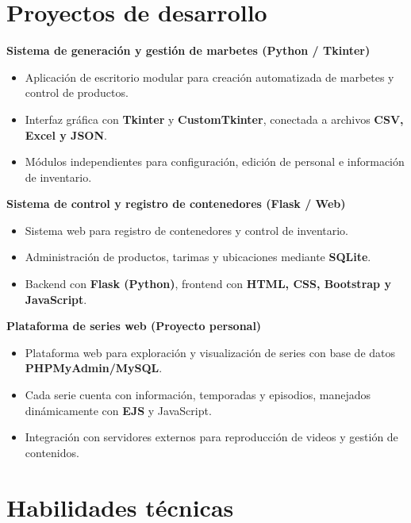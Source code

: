 \documentclass[11pt]{article}
\begin{document}
\vspace{6pt}

\section*{Proyectos de desarrollo}

\textbf{Sistema de generación y gestión de marbetes (Python / Tkinter)} 
\begin{itemize}[leftmargin=*, noitemsep]
    \item Aplicación de escritorio modular para creación automatizada de marbetes y control de productos.
    \item Interfaz gráfica con \textbf{Tkinter} y \textbf{CustomTkinter}, conectada a archivos \textbf{CSV, Excel y JSON}.
    \item Módulos independientes para configuración, edición de personal e información de inventario.
\end{itemize}

\textbf{Sistema de control y registro de contenedores (Flask / Web)} 
\begin{itemize}[leftmargin=*, noitemsep]
    \item Sistema web para registro de contenedores y control de inventario.
    \item Administración de productos, tarimas y ubicaciones mediante \textbf{SQLite}.
    \item Backend con \textbf{Flask (Python)}, frontend con \textbf{HTML, CSS, Bootstrap y JavaScript}.
\end{itemize}

\textbf{Plataforma de series web (Proyecto personal)}
\begin{itemize}[leftmargin=*, noitemsep]
    \item Plataforma web para exploración y visualización de series con base de datos \textbf{PHPMyAdmin/MySQL}.
    \item Cada serie cuenta con información, temporadas y episodios, manejados dinámicamente con \textbf{EJS} y JavaScript.
    \item Integración con servidores externos para reproducción de videos y gestión de contenidos.
\end{itemize}

\vspace{6pt}

\section*{Habilidades técnicas}
\end{document}
